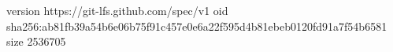 version https://git-lfs.github.com/spec/v1
oid sha256:ab81fb39a54b6e06b75f91c457e0e6a22f595d4b81ebeb0120fd91a7f54b6581
size 2536705
